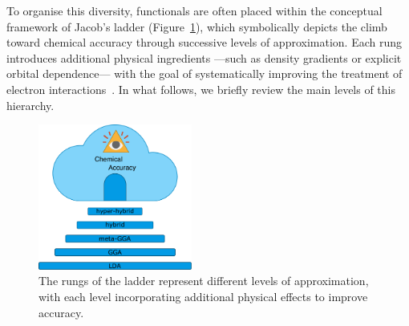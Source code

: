 To organise this diversity, functionals are often placed within the conceptual
framework of Jacob's ladder (Figure~\ref{ladder_eye}), which symbolically
depicts the climb toward chemical accuracy through successive levels of
approximation. Each rung introduces additional physical ingredients ---such as
density gradients or explicit orbital dependence--- with the goal of
systematically improving the treatment of electron
interactions~\cite{Perdew2001}. In what follows, we briefly review the main
levels of this hierarchy.

\begin{figure}[H]
  \centering
  \includegraphics[width=0.45\textwidth]{img/heaven.pdf}
  \caption{The rungs of the
    ladder represent different levels of approximation, with each level
    incorporating additional physical effects to improve accuracy.}
  \label{ladder_eye}
\end{figure}


